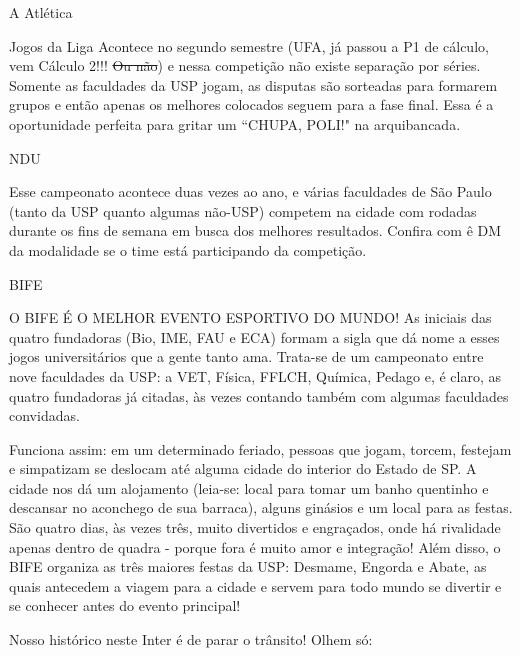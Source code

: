 \begin{secao}{A Atlética}
\begin{subsecao}{Jogos da Liga}
Acontece no segundo semestre (UFA, já passou a P1 de cálculo, vem Cálculo 2!!!
\sout{Ou não}) e nessa competição não existe separação por séries. Somente as
faculdades da USP jogam, as disputas são sorteadas para formarem grupos e
então apenas os melhores colocados seguem para a fase final. Essa é a
oportunidade perfeita para gritar um ``CHUPA, POLI!" na arquibancada.

\end{subsecao}
\begin{subsecao}{NDU}

Esse campeonato acontece duas vezes ao ano, e várias faculdades de São Paulo
(tanto da USP quanto algumas não-USP) competem na cidade com rodadas durante
os fins de semana em busca dos melhores
resultados. Confira com ê DM da modalidade se o time está participando da
competição.

\end{subsecao}
\begin{subsecao}{BIFE}

O BIFE É O MELHOR EVENTO ESPORTIVO DO MUNDO! As iniciais das quatro fundadoras
(Bio, IME, FAU e ECA) formam a sigla que dá nome a esses jogos universitários
que a gente tanto ama. Trata-se de um campeonato entre nove faculdades da USP:
a VET, Física, FFLCH, Química, Pedago e, é claro, as quatro fundadoras já 
citadas, às vezes contando também com algumas faculdades convidadas.

Funciona assim: em um determinado feriado, pessoas que jogam, torcem, festejam e
simpatizam se deslocam até alguma cidade do interior do Estado de SP. A cidade nos
dá um alojamento (leia-se: local para tomar um banho quentinho e descansar no
aconchego de sua barraca), alguns ginásios e um local para as festas. São
quatro dias, às vezes três, muito divertidos e engraçados, onde há rivalidade 
apenas dentro de quadra - porque fora é muito amor e integração! Além disso,
o BIFE organiza as três maiores festas da USP: Desmame, Engorda e Abate, as
quais antecedem a viagem para a cidade e servem para todo mundo se divertir e
se conhecer antes do evento principal!

Nosso histórico neste Inter é de parar o trânsito! Olhem só:


\end{subsecao}
\end{secao}
